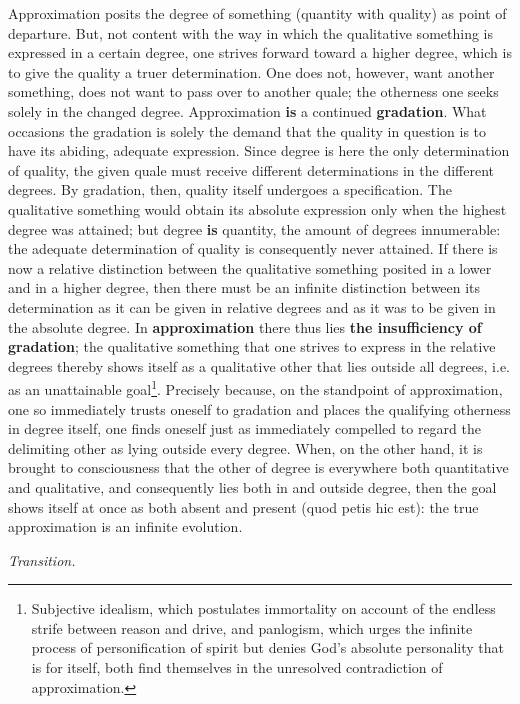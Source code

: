 \documentclass[12pt,a4paper,openany]{book}
\newcommand{\opage}[1]{\marginnote{\footnotesize\textit{[#1]}}}
\newcommand{\overgang}{\begin{center}\emph{Transition.}\end{center}}
\begin{document}
Approximation posits the degree of something (quantity with quality) as point of departure. But, not content with the way in which the qualitative something is expressed in a certain degree, one strives forward toward a higher degree, which is to give the quality a truer determination. One does not, however, want another something, does not want to pass over to another quale; the otherness one seeks solely in the changed degree. Approximation \textbf{is} a continued \textbf{gradation}. What occasions the gradation is solely the demand that the quality in question is to have its abiding, adequate expression. Since degree is here the only determination of quality, the given quale must receive different determinations in the different degrees. By gradation, then, quality itself undergoes a specification. The qualitative something would obtain its absolute expression only when the highest degree was attained; but degree \textbf{is}
\setcounter{footnote}{0}%
\opage{49}quantity, the amount of degrees innumerable: the adequate determination of quality is consequently never attained. If there is now a relative distinction between the qualitative something posited in a lower and in a higher degree, then there must be an infinite distinction between its determination as it can be given in relative degrees and as it was to be given in the absolute degree. In \textbf{approximation} there thus lies \textbf{the insufficiency of gradation}; the qualitative something that one strives to express in the relative degrees thereby shows itself as a qualitative other that lies outside all degrees, i.e. as an unattainable goal\footnote{Subjective idealism, which postulates immortality on account of the endless strife between reason and drive, and panlogism, which urges the infinite process of personification of spirit but denies God's absolute personality that is for itself, both find themselves in the unresolved contradiction of approximation.}. Precisely because, on the standpoint of approximation, one so immediately trusts oneself to gradation and places the qualifying otherness in degree itself, one finds oneself just as immediately compelled to regard the delimiting other as lying outside every degree. When, on the other hand, it is brought to consciousness that the other of degree is everywhere both quantitative and qualitative, and consequently lies both in and outside degree, then the goal shows itself at once as both absent and present (quod petis hic est): the true approximation is an infinite evolution.

\overgang
\end{document}
